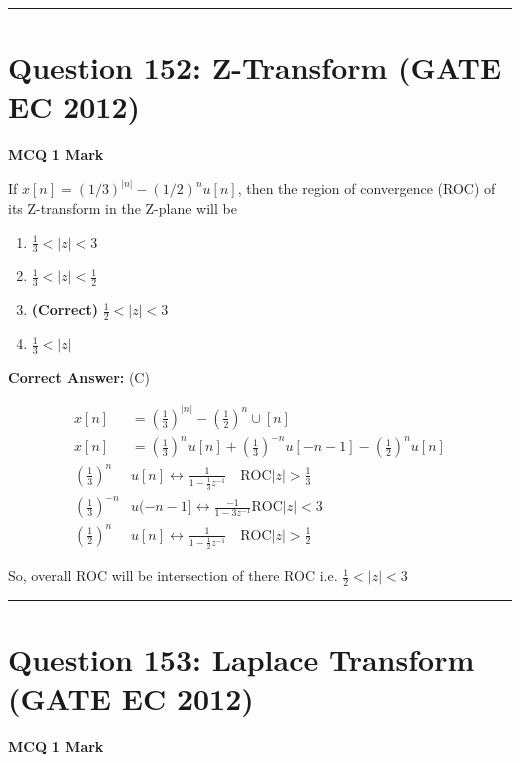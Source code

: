\documentclass[11pt,a4paper]{article}
\begin{document}
\vspace{1.5em}
\hrule
\vspace{1.5em}

\section*{Question 152: Z-Transform (GATE EC 2012)}
\noindent \textbf{\color{primary}MCQ} \hfill \textbf{\color{secondary}1 Mark}


\noindent If $x[n]=(1/3)^{|n|}-(1/2)^{n}u[n]$, then the region of convergence (ROC) of its Z-transform in the Z-plane will be


\begin{enumerate}[label=(\Alph*)]
    \item $\frac{1}{3} < |z| < 3$
    \item $\frac{1}{3} < |z| < \frac{1}{2}$
    \item \textbf{(Correct)} $\frac{1}{2} < |z| < 3$
    \item $\frac{1}{3} < |z|$
\end{enumerate}

\noindent \textbf{Correct Answer:} (C)

\begin{tcolorbox}[solbox, title=Detailed Solution -- Question 152]
\[
\begin{aligned} x[n]&=\left(\frac{1}{3}\right)^{|n|}-\left(\frac{1}{2}\right)^{n} \cup[n] \\ x[n]&=\left(\frac{1}{3}\right)^{n}u[n]+\left(\frac{1}{3}\right)^{-n} u[-n-1]-\left(\frac{1}{2}\right)^{n} u[n] \\ \left(\frac{1}{3}\right)^{n} &u[n] \longleftrightarrow \frac{1}{1-\frac{1}{3} z^{-1}} \quad \text{ROC}|z|> \frac{1}{3} \\ \left(\frac{1}{3}\right)^{-n} &u(-n-1] \longleftrightarrow \frac{-1}{1-3 z^{-1}} \text{ROC}|z| < 3 \\ \left(\frac{1}{2}\right)^{n} &u[n] \longleftrightarrow \frac{1}{1-\frac{1}{2} z^{-1}} \quad \text{ROC}|z| > \frac{1}{2} \end{aligned}
\]

 So, overall ROC will be intersection of there ROC
 i.e.
$\frac{1}{2}< |z| < 3$
\end{tcolorbox}

\vspace{1.5em}
\hrule
\vspace{1.5em}

\section*{Question 153: Laplace Transform (GATE EC 2012)}
\noindent \textbf{\color{primary}MCQ} \hfill \textbf{\color{secondary}1 Mark}
\end{document}
